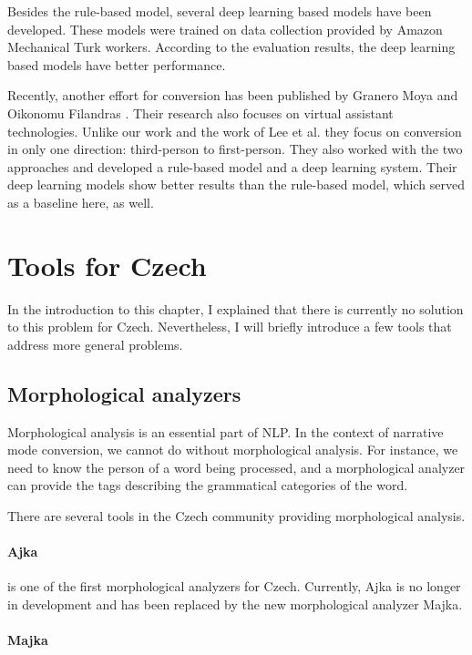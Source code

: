 Besides the rule-based model, several deep learning based models have been developed. These models were trained on data collection provided by Amazon Mechanical Turk workers. According to the evaluation results, the deep learning based models have better performance.

Recently, another effort for conversion has been published by Granero Moya and Oikonomu Filandras \cite{granero-moya-oikonomou-filandras-2021-taking}. Their research also focuses on virtual assistant technologies. Unlike our work and the work of Lee et al. they focus on conversion in only one direction: third-person to first-person. They also worked with the two approaches and developed a rule-based model and a deep learning system. Their deep learning models show better results than the rule-based model, which served as a baseline here, as well.

\section{Tools for Czech}

In the introduction to this chapter, I explained that there is currently no solution to this problem for Czech. Nevertheless, I will briefly introduce a few tools that address more general problems.

\subsection{Morphological analyzers}

Morphological analysis is an essential part of NLP. In the context of narrative mode conversion, we cannot do without morphological analysis. For instance, we need to know the person of a word being processed, and a morphological analyzer can provide the tags describing the grammatical categories of the word.

There are several tools in the Czech community providing morphological analysis.

\paragraph{Ajka}

is one of the first morphological analyzers for Czech. Currently, Ajka is no longer in development and has been replaced by the new morphological analyzer Majka. \cite{Sedlacekthesis}

\paragraph{Majka}

